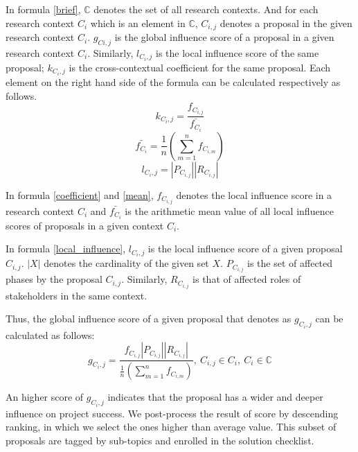 In formula \ref{brief}, $\mathbb{C}$ denotes the set of all research contexts. And for each research context $C_{i}$ which is an element in $\mathbb{C}$, $C_{i,j}$ denotes a proposal in the given research context $C_{i}$. $g_{Ci,j}$ is the global influence score of a proposal in a given research context $C_{i}$. Similarly, $l_{C_{i},j}$ is the local influence score of the same proposal; $\mathit{k_{C_{i},j}}$ is the cross-contextual coefficient for the same proposal. Each element on the right hand side of the formula can be calculated respectively as follows.
\begin{equation}
\mathit{k_{C_{i},j}} = \frac{f_{C_{i,j}}}{\bar{f_{C_i}}}
\label{coefficient}
\end{equation}
\begin{equation}
\bar{f_{C_i}} = \frac{1}{n}\left (\sum_{m=1}^n{f_{C_{i,m}}}\right)
\label{mean}
\end{equation}
\begin{equation}
l_{C_{i},j} = |P_{C_{i,j}}||R_{C_{i,j}}|
\label{local_influence}
\end{equation}

In formula \ref{coefficient} and \ref{mean}, $f_{C_{i,j}}$ denotes the local influence score in a research context $C_{i}$ and $\bar{f_{C_i}}$ is the arithmetic mean value of all local influence scores of proposals in a given context $C_{i}$.

In formula \ref{local_influence}, $l_{C_{i},j}$ is the local influence score of a given proposal $C_{i,j}$. $|X|$ denotes the cardinality of the given set $X$. $P_{C_{i,j}}$ is the set of affected phases by the proposal $C_{i,j}$. Similarly, $R_{C_{i,j}}$ is that of affected roles of stakeholders in the same context.

Thus, the global influence score of a given proposal that denotes as $g_{C_{i},j}$ can be calculated as follows:
\begin{equation}
g_{C_{i},j} =
\frac
{f_{C_{i,j}} |P_{C_{i,j}}| |R_{C_{i,j}}|} 
{\frac{1}{n}\left (\sum_{m=1}^n{f_{C_{i,m}}}\right)}
,\ 
C_{i,j} \in C_{i},\ C_{i} \in \mathbb{C}
\label{final}
\end{equation}

An higher score of $g_{C_{i},j}$ indicates that the proposal has a wider and deeper influence on project success. We post-process the result of score by descending ranking, in which we select the ones higher than average value. This subset of proposals are tagged by sub-topics and enrolled in the solution checklist.

